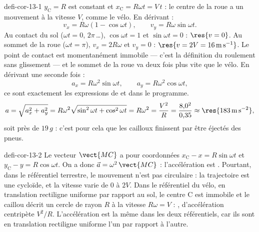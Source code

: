 \begin{blocEdition}{defi-cor-13-1}
$y_\mathrm{C}=R$ est constant et $x_\mathrm{C}=R\omega t=V\,t$ : le centre de la roue a un mouvement
 à la vitesse $V$, comme le vélo.
En dérivant :
\[v_x=R\omega\left(1-\cos\omega t\right),\qquad v_y=R\omega\sin\omega t.\]
Au contact du sol ($\omega t=0$, $2\pi$\,\dots), $\cos\omega t=1$ et $\sin\omega t=0$ : $\res{v=0}$. Au sommet de la roue
($\omega t=\pi$), $v_x=2R\omega$ et $v_y=0$ : $\res{v=2V=\qty{16}{m.s^{-1}}}$. Le point de contact est momentanément
immobile — c'est la définition du roulement sans glissement — et le sommet de la roue va deux fois plus vite que le vélo.
En dérivant une seconde fois :
\[a_x=R\omega^2\sin\omega t,\qquad a_y=R\omega^2\cos\omega t,\]
ce sont exactement les expressions de  et  dans le programme.
\[a=\sqrt{a_x^2+a_y^2}=R\omega^2\sqrt{\sin^2\omega t+\cos^2\omega t}=R\omega^2=\frac{V^2}{R}=\frac{8{,}0^2}{0{,}35}\approx\res{\qty{183}{m.s^{-2}}},\]
soit près de $19\,g$ : c'est pour cela que les cailloux finissent par être éjectés des pneus.
\end{blocEdition}

\begin{blocEdition}{defi-cor-13-2}
\label{figedition-defi-cor-13-2-1}
Le vecteur $\vect{MC}$ a pour coordonnées $x_\mathrm{C}-x=R\sin\omega t$ et $y_\mathrm{C}-y=R\cos\omega t$. On a donc $\vec{a}=\omega^2\,\vect{MC}$ : l'accélération est . Pourtant, dans le référentiel terrestre,
le mouvement n'est pas circulaire : la trajectoire est une cycloïde, et la vitesse varie de 0 à $2V$. Dans le
référentiel du vélo, en translation rectiligne uniforme par rapport au sol, le centre C est immobile et le caillou
décrit un cercle de rayon $R$ à la vitesse $R\omega=V$ : , d'accélération
centripète $V^2/R$. L'accélération est la même dans les deux référentiels, car ils sont en translation rectiligne
uniforme l'un par rapport à l'autre.
\end{blocEdition}

